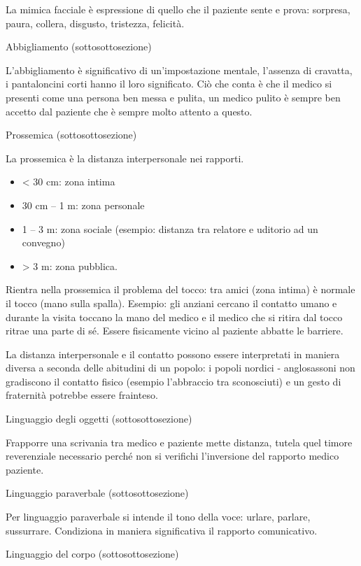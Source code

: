 \documentclass[]{article}
\begin{document}
La mimica facciale è espressione di quello che il paziente sente e
prova: sorpresa, paura, collera, disgusto, tristezza, felicità.

Abbigliamento (sottosottosezione)

L'abbigliamento è significativo di un'impostazione mentale, l'assenza di
cravatta, i pantaloncini corti hanno il loro significato. Ciò che conta
è che il medico si presenti come una persona ben messa e pulita, un
medico pulito è sempre ben accetto dal paziente che è sempre molto
attento a questo.

Prossemica (sottosottosezione)

La prossemica è la distanza interpersonale nei rapporti.

\begin{itemize}
\item
  \textless{} 30 cm: zona intima
\item
  30 cm -- 1 m: zona personale
\item
  1 -- 3 m: zona sociale (esempio: distanza tra relatore e uditorio ad
  un convegno)
\item
  \textgreater{} 3 m: zona pubblica.
\end{itemize}

Rientra nella prossemica il problema del tocco: tra amici (zona intima)
è normale il tocco (mano sulla spalla). Esempio: gli anziani cercano il
contatto umano e durante la visita toccano la mano del medico e il
medico che si ritira dal tocco ritrae una parte di sé. Essere
fisicamente vicino al paziente abbatte le barriere.

La distanza interpersonale e il contatto possono essere interpretati in
maniera diversa a seconda delle abitudini di un popolo: i popoli nordici
- anglosassoni non gradiscono il contatto fisico (esempio l'abbraccio
tra sconosciuti) e un gesto di fraternità potrebbe essere frainteso.

Linguaggio degli oggetti (sottosottosezione)

Frapporre una scrivania tra medico e paziente mette distanza, tutela
quel timore reverenziale necessario perché non si verifichi l'inversione
del rapporto medico paziente.

Linguaggio paraverbale (sottosottosezione)

Per linguaggio paraverbale si intende il tono della voce: urlare,
parlare, sussurrare. Condiziona in maniera significativa il rapporto
comunicativo.

Linguaggio del corpo (sottosottosezione)
\end{document}
